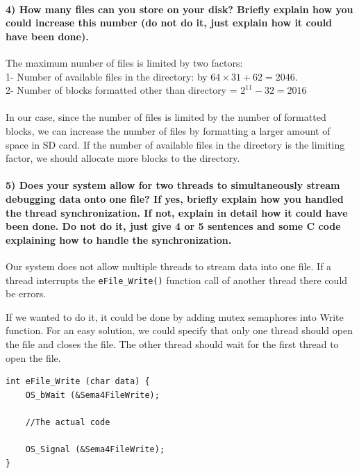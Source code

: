 \documentclass[a4paper]{article}
\begin{document}
\paragraph{4) How many files can you store on your disk? Briefly explain how you could increase this number (do not do 
it, just explain how it could have been done). \\}

The maximum number of files is limited by two factors:\\
1- Number of available files in the directory: by $64 \times 31 + 62 = 2046$. \\
2- Number of blocks formatted other than directory = $2^11 - 32= 2016$ \\
\\
In our case, since the number of files is limited by the number of formatted blocks, we can increase the number of files by formatting a larger amount of space in SD card. If the number of available files in the directory is the limiting factor, we should allocate more blocks to the directory.

\paragraph{5) Does your system allow for two threads to simultaneously stream debugging data onto one file? If yes, 
briefly explain how you handled the thread synchronization. If not, explain in detail how it could have been done. 
Do not do it, just give 4 or 5 sentences and some C code explaining how to handle the synchronization. \\}

Our system does not allow multiple threads to stream data into one file. If a thread interrupts the \texttt{eFile\_Write()} function call of another thread there could be errors.

If we wanted to do it, it could be done by adding mutex semaphores into Write function. For an easy solution, we could specify that only one thread should open the file and closes the file. The other thread should wait for the first thread to open the file.

{ \lstset{language=C, frame=none, numbers=none}
\begin{lstlisting}
int eFile_Write (char data) {
	OS_bWait (&Sema4FileWrite);
	
	//The actual code
	
	OS_Signal (&Sema4FileWrite);
}

\end{lstlisting}
}
\end{document}
